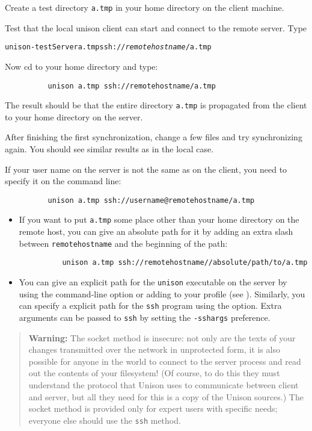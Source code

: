 \documentclass{article}
\newcommand{\NT}[1]{\textit{#1}}
\begin{document}
Create a test directory {\tt a.tmp} in your home directory on the client
machine.  

Test that the local unison client can start and connect to the
remote server.  Type
\begin{alltt}
          unison -testServer a.tmp ssh://\NT{remotehostname}/a.tmp
\end{alltt}

Now cd to your home directory and type:
\begin{verbatim}
          unison a.tmp ssh://remotehostname/a.tmp
\end{verbatim}
The result should be that the entire directory {\tt a.tmp} is propagated
from the client to your home directory on the server.

After finishing the first synchronization, change a few files and try
synchronizing again.  You should see similar results as in the local
case.

If your user name on the server is not the same as on the client, you
need to specify it on the command line:
\begin{verbatim}
          unison a.tmp ssh://username@remotehostname/a.tmp
\end{verbatim}

\begin{itemize}
\item If you want to put \verb|a.tmp| some place other than your home
directory on the remote host, you can give an absolute path for it by
adding an extra slash between \verb|remotehostname| and the beginning
of the path:
\begin{verbatim}
          unison a.tmp ssh://remotehostname//absolute/path/to/a.tmp
\end{verbatim}

\item You can give an explicit path for the \verb|unison| executable
  on the server by using the command-line option  or adding
   to your profile (see
  ).  Similarly, you can specify a
  explicit path for the \verb|ssh| program using the 
  option.
  Extra arguments can be passed to \verb|ssh| by setting the
  \verb|-sshargs| preference.
\end{itemize}



\begin{quote}
  {\bf\ifhevea\red\fi Warning:} The socket method is 
  insecure: not only are the texts of your changes transmitted over
  the network in unprotected form, it is also possible for anyone in
  the world to connect to the server process and read out the contents
  of your filesystem!  (Of course, to do this they must understand the
  protocol that Unison uses to communicate between client and server,
  but all they need for this is a copy of the Unison sources.)  The socket
  method is provided only for expert users with specific needs; everyone
  else should use the \verb|ssh| method.
\end{quote}
\end{document}
